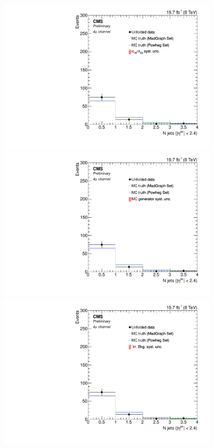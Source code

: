 \begin{figure}[hbtp]
  \begin{center}
    \includegraphics[width=0.8\cmsFigWidth]{Figures/Unfolding/Systematics/ZZTo4m_CentralJets_qqgg_Mad_fr}     
    \includegraphics[width=0.8\cmsFigWidth]{Figures/Unfolding/Systematics/ZZTo4m_CentralJets_MCgen_Mad_fr}     
    \includegraphics[width=0.8\cmsFigWidth]{Figures/Unfolding/Systematics/ZZTo4m_CentralJets_IrrBkg_Mad_fr}

\end{center}
\end{figure}
